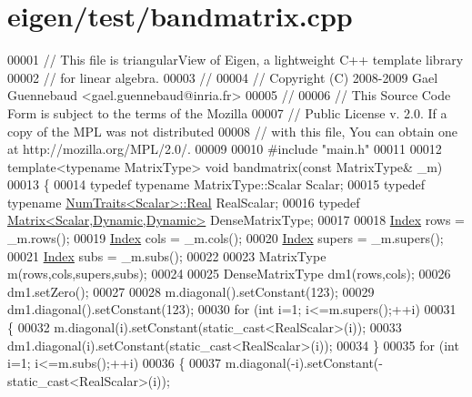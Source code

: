 \hypertarget{eigen_2test_2bandmatrix_8cpp_source}{}\section{eigen/test/bandmatrix.cpp}
\label{eigen_2test_2bandmatrix_8cpp_source}

\begin{DoxyCode}
00001 \textcolor{comment}{// This file is triangularView of Eigen, a lightweight C++ template library}
00002 \textcolor{comment}{// for linear algebra.}
00003 \textcolor{comment}{//}
00004 \textcolor{comment}{// Copyright (C) 2008-2009 Gael Guennebaud <gael.guennebaud@inria.fr>}
00005 \textcolor{comment}{//}
00006 \textcolor{comment}{// This Source Code Form is subject to the terms of the Mozilla}
00007 \textcolor{comment}{// Public License v. 2.0. If a copy of the MPL was not distributed}
00008 \textcolor{comment}{// with this file, You can obtain one at http://mozilla.org/MPL/2.0/.}
00009 
00010 \textcolor{preprocessor}{#include "main.h"}
00011 
00012 \textcolor{keyword}{template}<\textcolor{keyword}{typename} MatrixType> \textcolor{keywordtype}{void} bandmatrix(\textcolor{keyword}{const} MatrixType& \_m)
00013 \{
00014   \textcolor{keyword}{typedef} \textcolor{keyword}{typename} MatrixType::Scalar Scalar;
00015   \textcolor{keyword}{typedef} \textcolor{keyword}{typename} \hyperlink{group___core___module_struct_eigen_1_1_num_traits}{NumTraits<Scalar>::Real} RealScalar;
00016   \textcolor{keyword}{typedef} \hyperlink{group___core___module}{Matrix<Scalar,Dynamic,Dynamic>} DenseMatrixType;
00017 
00018   \hyperlink{namespace_eigen_a62e77e0933482dafde8fe197d9a2cfde}{Index} rows = \_m.rows();
00019   \hyperlink{namespace_eigen_a62e77e0933482dafde8fe197d9a2cfde}{Index} cols = \_m.cols();
00020   \hyperlink{namespace_eigen_a62e77e0933482dafde8fe197d9a2cfde}{Index} supers = \_m.supers();
00021   \hyperlink{namespace_eigen_a62e77e0933482dafde8fe197d9a2cfde}{Index} subs = \_m.subs();
00022 
00023   MatrixType m(rows,cols,supers,subs);
00024 
00025   DenseMatrixType dm1(rows,cols);
00026   dm1.setZero();
00027 
00028   m.diagonal().setConstant(123);
00029   dm1.diagonal().setConstant(123);
00030   \textcolor{keywordflow}{for} (\textcolor{keywordtype}{int} i=1; i<=m.supers();++i)
00031   \{
00032     m.diagonal(i).setConstant(static\_cast<RealScalar>(i));
00033     dm1.diagonal(i).setConstant(static\_cast<RealScalar>(i));
00034   \}
00035   \textcolor{keywordflow}{for} (\textcolor{keywordtype}{int} i=1; i<=m.subs();++i)
00036   \{
00037     m.diagonal(-i).setConstant(-static\_cast<RealScalar>(i));

\end{DoxyCode}
